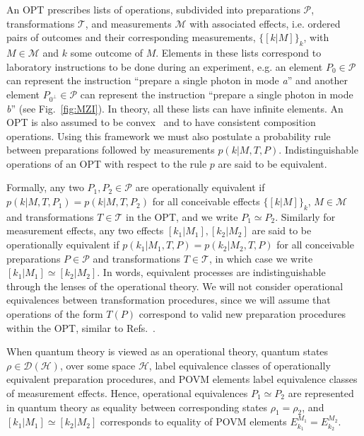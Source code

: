 \documentclass[a4paper,twocolumn,11pt,accepted=2024-01-17]{quantumarticle}
\begin{document}
An OPT prescribes lists of operations, subdivided into preparations $\mathcal{P}$, transformations $\mathcal{T}$, and measurements $\mathcal{M}$ with associated effects{, i.e. ordered pairs of outcomes and their corresponding measurements,} $\{[k \vert M]\}_k${, with $M \in \mathcal{M}$ and $k$ some outcome of $M$}. Elements in these lists correspond to laboratory instructions to be done during an experiment, e.g. an element $P_0 \in \mathcal{P}$ can represent the instruction ``prepare a single photon in mode \textit{a}'' and another element $P_{0^\perp} \in \mathcal{P}$ can represent the instruction  ``prepare a single photon in mode \textit{b}'' (see Fig.~\ref{fig:MZI}). In theory, all these lists can have infinite elements. An OPT is also assumed to be convex~\cite{schmid2020structure} and to have consistent composition operations.  Using this framework we must also postulate  a probability rule between preparations followed by measurements $p(k\vert M,T,P)$. Indistinguishable operations of an OPT with respect to the rule $p$ are said to be equivalent. 

Formally, any two $P_1,P_2 \in \mathcal{P}$ are operationally equivalent if $p(k\vert M,T,P_1) = p(k \vert M,T,P_2)$ for all conceivable effects $\{[k \vert M]\}_k$, $M \in \mathcal{M}$ and transformations $T \in \mathcal{T}$ in the OPT, and we write $P_1 \simeq P_2$. Similarly for measurement effects{, any two effects $[k_1|M_1], [k_2|M_2]$ are said to be operationally equivalent if $p(k_1|M_1,T,P) = p(k_2|M_2,T,P)$ for all conceivable preparations $P \in \mathcal{P}$ and transformations $T \in \mathcal{T}$, in which case we write $[k_1|M_1] \simeq [k_2|M_2]$}. In words, equivalent processes are indistinguishable through the lenses of the operational theory. We will not consider operational equivalences between transformation procedures, since we will assume that operations of the form $T(P)$ correspond to valid new preparation procedures within the OPT, similar to Refs.~\cite{Lostaglio2020contextualadvantage,baldijao_emergence_2021}.

When quantum theory is viewed as an operational theory, quantum states $\rho \in \mathcal{D}(\mathcal{H})$, over some space $\mathcal{H}$, label equivalence classes of operationally equivalent preparation procedures, and POVM elements label equivalence classes of measurement effects. Hence, operational equivalences $P_1\simeq P_2$ are represented in quantum theory as equality between corresponding states $\rho_1 = \rho_2$, and $[k_1\vert M_1]\simeq [k_2\vert M_2]$ corresponds to equality of POVM elements $E_{k_1}^{M_1} = E_{k_2}^{M_2}$.
\end{document}
